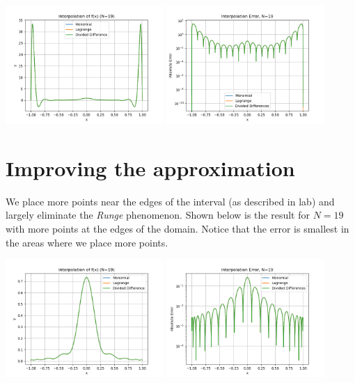 \documentclass[10pt]{article}
\begin{document}
\begin{center}
  \includegraphics[width=0.45\textwidth]{lab7_interp_N19.png}
  \includegraphics[width=0.45\textwidth]{lab7_interp_error_N19.png}
\end{center}

\section{Improving the approximation}
We place more points near the edges of the interval (as described in lab) and largely eliminate the \textit{Runge} phenomenon. Shown below is the result for \(N=19\) with more points at the edges of the domain. Notice that the error is smallest in the areas where we place more points.

\begin{center}
  \includegraphics[width=0.45\textwidth]{lab7_uneven_interp_N19.png}
  \includegraphics[width=0.45\textwidth]{lab7_uneven_interp_error_N19.png}
\end{center}

{\small }   
\end{document}
